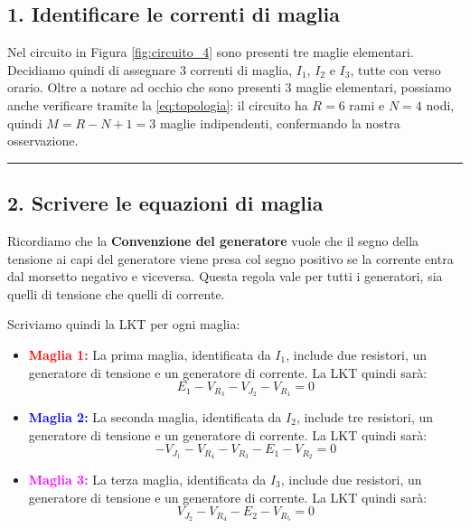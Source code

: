 
\subsection*{1. Identificare le correnti di maglia}

Nel circuito in Figura \ref{fig:circuito_4}
sono presenti tre maglie elementari. Decidiamo quindi di assegnare 3 correnti di maglia, \(I_1\), \(I_2\) e \(I_3\), tutte con verso orario. Oltre a notare ad occhio che sono presenti 3 maglie elementari, possiamo anche verificare tramite la \ref{eq:topologia}: il circuito ha \(R = 6\) rami e \(N = 4\) nodi, quindi \(M = R-N+1 = 3\) maglie indipendenti, confermando la nostra osservazione.



\hrule
\subsection*{2. Scrivere le equazioni di maglia}

Ricordiamo che la \textbf{Convenzione del generatore} vuole che il segno della tensione ai capi del generatore viene presa col segno positivo se la corrente entra dal morsetto negativo e viceversa. Questa regola vale per tutti i generatori, sia quelli di tensione che quelli di corrente.


Scriviamo quindi la LKT per ogni maglia:
\begin{itemize}
    \item \textcolor{red}{\textbf{Maglia 1:}} La prima maglia, identificata da \(I_1\), include due resistori, un generatore di tensione e un generatore di corrente. La LKT quindi sarà:
          \begin{equation}
              E_1 - V_{R_3} - V_{J_2} - V_{R_1} = 0
              \label{eq: prima_maglia_corrente}
          \end{equation}
    \item \textcolor{blue}{\textbf{Maglia 2:}} La seconda maglia, identificata da \(I_2\), include tre resistori, un generatore di tensione e un generatore di corrente. La LKT quindi sarà:
          \begin{equation}
              - V_{J_1} - V_{R_4} - V_{R_3} - E_1 - V_{R_2} = 0
              \label{eq: seconda_maglia_corrente}
          \end{equation}
    \item \textcolor{magenta}{\textbf{Maglia 3:}} La terza maglia, identificata da \(I_3\), include due resistori, un generatore di tensione e un generatore di corrente. La LKT quindi sarà:
          \begin{equation}
              V_{J_2} - V_{R_4} - E_2 - V_{R_5} = 0
              \label{eq: terza_maglia_corrente}
          \end{equation}
\end{itemize}


